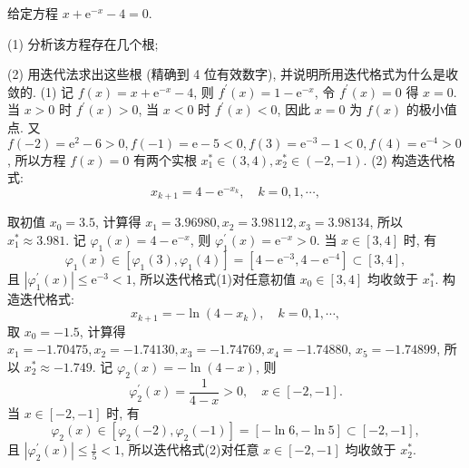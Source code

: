 \begin{tcolorbox}[enhanced,colback=8,colframe=7,breakable,coltitle=green!25!black,title=2024]
 给定方程 $ x+\mathrm{e}^{-x}-4=0 $.
 
(1) 分析该方程存在几个根;

(2) 用迭代法求出这些根 (精确到 4 位有效数字), 并说明所用迭代格式为什么是收敛的.
 \tcblower
(1) 记 $ f(x)=x+\mathrm{e}^{-x}-4 $, 则 $ f^{\prime}(x)=1-\mathrm{e}^{-x} $, 令 $ f^{\prime}(x)=0 $ 得 $ x=0 $.当 $ x>0 $ 时 $ f^{\prime}(x)>0 $, 当 $ x<0 $ 时 $ f^{\prime}(x)<0 $, 因此 $ x=0 $ 为 $ f(x) $ 的极小值点. 又 $ f(-2)=\mathrm{e}^{2}-6>0, f(-1)=\mathrm{e}-5<0, f(3)=\mathrm{e}^{-3}-1<0, f(4)=\mathrm{e}^{-4}>0 $, 所以方程 $ f(x)=0 $ 有两个实根 $ x_{1}^{*} \in(3,4), x_{2}^{*} \in(-2,-1) $.
(2) 构造迭代格式:
\begin{equation*}
    x_{k+1}=4-\mathrm{e}^{-x_{k}}, \quad k=0,1, \cdots,\tag{1}
\end{equation*}


取初值 $ x_{0}=3.5 $, 计算得 $ x_{1}=3.96980, x_{2}=3.98112, x_{3}=3.98134 $, 所以 $ x_{1}^{*} \approx 3.981 $.
记 $ \varphi_{1}(x)=4-\mathrm{e}^{-x} $, 则 $ \varphi_{1}^{\prime}(x)=\mathrm{e}^{-x}>0 $.
当 $ x \in[3,4] $ 时, 有
$$
\varphi_{1}(x) \in\left[\varphi_{1}(3), \varphi_{1}(4)\right]=\left[4-\mathrm{e}^{-3}, 4-\mathrm{e}^{-4}\right] \subset[3,4],
$$
且 $ \left|\varphi_{1}^{\prime}(x)\right| \leqslant \mathrm{e}^{-3}<1 $, 所以迭代格式(1)对任意初值 $ x_{0} \in[3,4] $ 均收敛于 $ x_{1}^{*} $.
构造迭代格式:
\begin{equation*}
    x_{k+1}=-\ln \left(4-x_{k}\right), \quad k=0,1, \cdots,\tag{2}
\end{equation*}
取 $ x_{0}=-1.5 $, 计算得 $ x_{1}=-1.70475, x_{2}=-1.74130, x_{3}=-1.74769, x_{4}=-1.74880 $, $ x_{5}=-1.74899 $, 所以 $ x_{2}^{*} \approx-1.749 $.
记 $ \varphi_{2}(x)=-\ln (4-x) $, 则
$$
\varphi_{2}^{\prime}(x)=\frac{1}{4-x}>0, \quad x \in[-2,-1] .
$$
当 $ x \in[-2,-1] $ 时, 有
$$
\varphi_{2}(x) \in\left[\varphi_{2}(-2), \varphi_{2}(-1)\right]=[-\ln 6,-\ln 5] \subset[-2,-1],
$$
且 $ \left|\varphi_{2}^{\prime}(x)\right| \leqslant \frac{1}{5}<1 $, 所以迭代格式(2)对任意 $ x \in[-2,-1] $ 均收敛于 $ x_{2}^{*} $.
 \end{tcolorbox}



